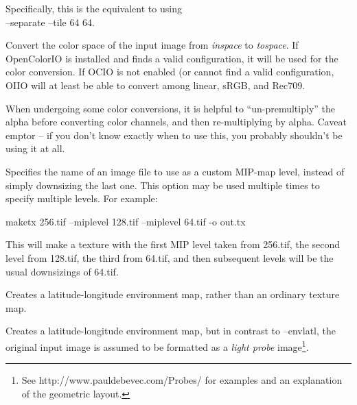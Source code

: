 Specifically, this is the equivalent to using \\
 {\cf --separate --tile 64 64}.
\apiend

Convert the color space of the input image from \emph{inspace} to
\emph{tospace}.  If OpenColorIO is installed and finds a valid
configuration, it will be used for the color conversion.  If OCIO
is not enabled (or cannot find a valid configuration, OIIO will at
least be able to convert among linear, sRGB, and Rec709.
\apiend

When undergoing some color conversions, it is helpful to
``un-premultiply'' the alpha before converting color channels, and then
re-multiplying by alpha.  Caveat emptor -- if you don't know exactly
when to use this, you probably shouldn't be using it at all.
\apiend


Specifies the name of an image file to use as a custom MIP-map level, 
instead of simply downsizing the last one.  This option may be used
multiple times to specify multiple levels.  For example:
\begin{code}
    maketx 256.tif --miplevel 128.tif --miplevel 64.tif -o out.tx
\end{code}
This will make a texture with the first MIP level taken from {\cf 256.tif},
the second level from {\cf 128.tif}, the third from {\cf 64.tif}, and
then subsequent levels will be the usual downsizings of {\cf 64.tif}.
\apiend

Creates a latitude-longitude environment map, rather than an ordinary
texture map.
\apiend

Creates a latitude-longitude environment map, but in contrast to
{\cf --envlatl}, the original input image is assumed to be formatted
as a \emph{light probe} image\footnote{See
{\cf http://www.pauldebevec.com/Probes/} for examples and an explanation
of the geometric layout.}.
\apiend




